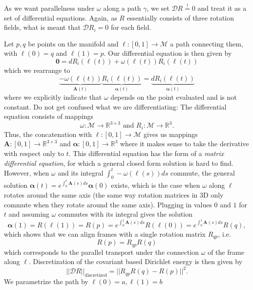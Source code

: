 \documentclass[../thesis.tex]{subfiles}
\begin{document}
As we want parallelness under $\omega$ along a path $\gamma$, we set $\mathcal{D}R \overset{!}{=}0$ and treat it as a set of
differential equations. Again, as $R$ essentially consists of 
three rotation fields, what is meant that $\mathcal{D}R_i =0$ for each field.

Let $p,q$ be points on the manifold and $\ell : [0,1]\to \mathcal{M}$ a path connecting them,
with $\ell(0)=q$ and $\ell(1)=p$.
Our differential equation is then given by
\begin{equation}
  \bm{0} = dR_i(\ell(t)) + \omega(\ell(t)) R_i(\ell(t))
\end{equation}
which we rearrange to
\begin{equation}
  \underbrace{-\omega (\ell(t))}_{\bm{A}(t)}  \underbrace{R_i(\ell(t))}_{\bm{\alpha}(t)} = \underbrace{dR_i(\ell(t))}_{\bm{\dot{\alpha}}(t)}
\end{equation}
where we explicitly indicate that $\omega$ depends on the point evaluated and is not constant.
Do not get confused what we are differentiating:
The differential equation consists of mappings 
$$\omega : \mathcal{M} \to \mathbb{R}^{3\times3} \text{ and }R_i : \mathcal{M}\to \mathbb{R}^3.$$
Thus, the concatenation with $\ell: [0,1] \to \mathcal{M}$ gives us mappings
$\bm{A}: [0,1] \to \mathbb{R}^{3\times 3}$ and $\bm{\alpha}:[0,1] \to \mathbb{R}^3$
where it makes sense to take the derivative with respect only to $t$.
This differential equation has the form of a \emph{matrix differential equation},
for which a general closed form solution is hard to find.
However, when $\omega$ and its integral $\int_0^t-\omega(\ell(s))ds$ commute, the general solution
$\bm{\alpha}(t)= e^{\int_0^t \bm{A}(s)ds}\bm{\alpha}(0)$ exists,
which is the case when $\omega$ along $\ell$ rotates around the same axis
(the same way rotation matrices in 3D only commute when they rotate around the same axis).
Plugging in values $0$ and $1$ for $t$ and assuming $\omega$ commutes with its integral gives the solution
$$\bm{\alpha}(1) = R(\ell(1)) = R(p) = e^{\int_0^1\bm{A}(s)ds}R(\ell(0))= e^{\int_0^1\bm{A}(s)ds}R(q),$$
which shows that we can 
align frames with a single rotation matrix $R_{qp}$, i.e.
$$R(p)= R_{qp}R(q)$$
which corresponds to the parallel transport under the connection $\omega$
of the frame along $\ell$.
Discretization of the covariant based Dirichlet energy is then given by
\begin{equation}\label{eq:dirichlet}
  ||\mathcal{D}R||_{\mathrm{discretized}}=||R_{qp}R(q)-R(p)||^2.
\end{equation}
We parametrize the path by $\ell(0)=a, \ell(1)=b$
\end{document}
